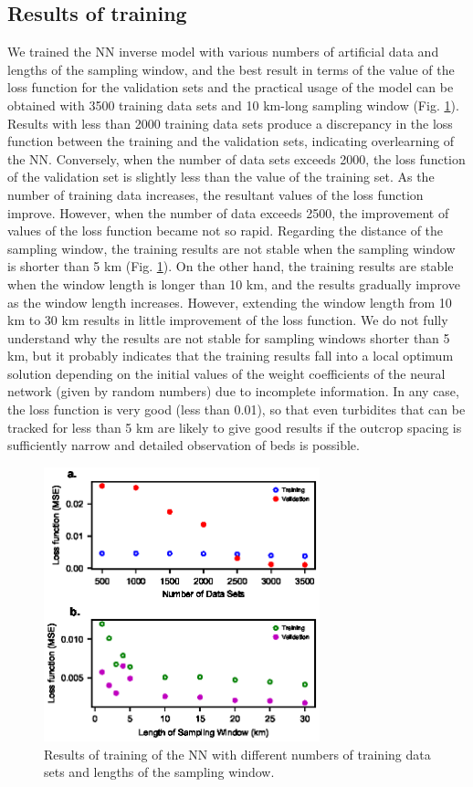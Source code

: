 \subsection{Results of training}
We trained the NN inverse model with various numbers of artificial data and lengths of the sampling window, and the best result in terms of the value of the loss function for the validation sets and the practical usage of the model can be obtained with 3500 training data sets and 10 km-long sampling window  (Fig. \ref{fig:training_different_number_length}). Results with less than 2000 training data sets produce a discrepancy in the loss function between the training and the validation sets, indicating overlearning of the NN. Conversely, when the number of data sets exceeds 2000, the loss function of the validation set is slightly less than the value of the training set. As the number of training data increases, the resultant values of the loss function improve. However, when the number of data exceeds 2500, the improvement of values of the loss function became not so rapid. Regarding the distance of the sampling window, the training results are not stable when the sampling window is shorter than 5 km (Fig. \ref{fig:training_different_number_length}). On the other hand, the training results are stable when the window length is longer than 10 km, and the results gradually improve as the window length increases. However, extending the window length from 10 km to 30 km results in little improvement of the loss function. We do not fully understand why the results are not stable for sampling windows shorter than 5 km, but it probably indicates that the training results fall into a local optimum solution depending on the initial values of the weight coefficients of the neural network (given by random numbers) due to incomplete information. In any case, the loss function is very good (less than 0.01), so that even turbidites that can be tracked for less than 5 km are likely to give good results if the outcrop spacing is sufficiently narrow and detailed observation of beds is possible.

\begin{figure}[t]
  \includegraphics[width=8cm]{fig05.eps}
  \caption{Results of training of the NN with different numbers of training data sets and lengths of the sampling window.}
  \label{fig:training_different_number_length}
\end{figure}

